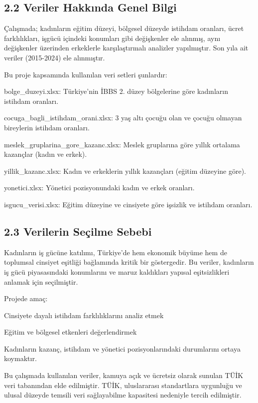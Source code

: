\documentclass[
  11pt,
  a4paper,
  DIV=11,
  numbers=noendperiod]{scrartcl}
\begin{document}
\subsection{2.2 Veriler Hakkında Genel
Bilgi}\label{veriler-hakkux131nda-genel-bilgi}

Çalışmada; kadınların eğitim düzeyi, bölgesel düzeyde istihdam oranları,
ücret farklılıkları, işgücü içindeki konumları gibi değişkenler ele
alınmış, aynı değişkenler üzerinden erkeklerle karşılaştırmalı analizler
yapılmıştır. Son yıla ait veriler (2015-2024) ele alınmıştır.

Bu proje kapsamında kullanılan veri setleri şunlardır:

bolge\_duzeyi.xlsx: Türkiye'nin İBBS 2. düzey bölgelerine göre
kadınların istihdam oranları.

cocuga\_bagli\_istihdam\_orani.xlsx: 3 yaş altı çocuğu olan ve çocuğu
olmayan bireylerin istihdam oranları.

meslek\_gruplarina\_gore\_kazanc.xlsx: Meslek gruplarına göre yıllık
ortalama kazançlar (kadın ve erkek).

yillik\_kazanc.xlsx: Kadın ve erkeklerin yıllık kazançları (eğitim
düzeyine göre).

yonetici.xlsx: Yönetici pozisyonundaki kadın ve erkek oranları.

isgucu\_verisi.xlsx: Eğitim düzeyine ve cinsiyete göre işsizlik ve
istihdam oranları.

\subsection{2.3 Verilerin Seçilme
Sebebi}\label{verilerin-seuxe7ilme-sebebi}

Kadınların iş gücüne katılımı, Türkiye'de hem ekonomik büyüme hem de
toplumsal cinsiyet eşitliği bağlamında kritik bir göstergedir. Bu
veriler, kadınların iş gücü piyasasındaki konumlarını ve maruz
kaldıkları yapısal eşitsizlikleri anlamak için seçilmiştir.

Projede amaç:

Cinsiyete dayalı istihdam farklılıklarını analiz etmek

Eğitim ve bölgesel etkenleri değerlendirmek

Kadınların kazanç, istihdam ve yönetici pozisyonlarındaki durumlarını
ortaya koymaktır.

Bu çalışmada kullanılan veriler, kamuya açık ve ücretsiz olarak sunulan
TÜİK veri tabanından elde edilmiştir. TÜİK, uluslararası standartlara
uygunluğu ve ulusal düzeyde temsili veri sağlayabilme kapasitesi
nedeniyle tercih edilmiştir.
\end{document}
